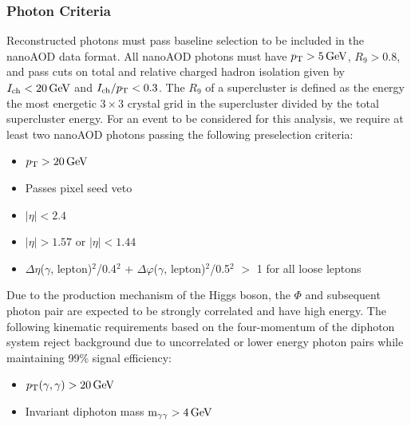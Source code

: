 \subsubsection{Photon Criteria} \label{sec:ana_photons}
Reconstructed photons must pass baseline selection to be included in the nanoAOD data format. All nanoAOD photons must have $p_{\mathrm{T}}>5\,\text{Ge\hspace{-.08em}V}$, $R_9>0.8$, and pass cuts on total and relative charged hadron isolation given by $I_\text{ch}<20\,\text{Ge\hspace{-.08em}V}$ and $I_\text{ch}/p_{\mathrm{T}}<0.3$. The $R_9$ of a supercluster is defined as the energy the most energetic $3\times3$ crystal grid in the supercluster divided by the total supercluster energy. For an event to be considered for this analysis, we require at least two nanoAOD photons passing the following preselection criteria:
\begin{itemize}
	\item $p_{\mathrm{T}}>20\,\text{Ge\hspace{-.08em}V}$
	\item Passes pixel seed veto
	\item $|\eta|<2.4$
	\item $|\eta|>1.57\text{ or }|\eta|<1.44$
	\item $\Delta\eta$($\gamma$, lepton)$^2$/0.4$^2$ + $\Delta\varphi$($\gamma$, lepton)$^2$/0.5$^2$ $>$ 1 for all loose leptons
\end{itemize}

Due to the production mechanism of the Higgs boson, the $\Phi$ and subsequent photon pair are expected to be strongly correlated and have high energy. The following kinematic requirements based on the four-momentum of the diphoton system reject background due to uncorrelated or lower energy photon pairs while maintaining 99\% signal efficiency:
\begin{itemize}
	\item $p_{\mathrm{T}}(\gamma,\gamma)>20\,\text{Ge\hspace{-.08em}V}$
	\item Invariant diphoton mass $\text{m}_{\gamma\gamma}>4\,\text{Ge\hspace{-.08em}V}$
\end{itemize}

